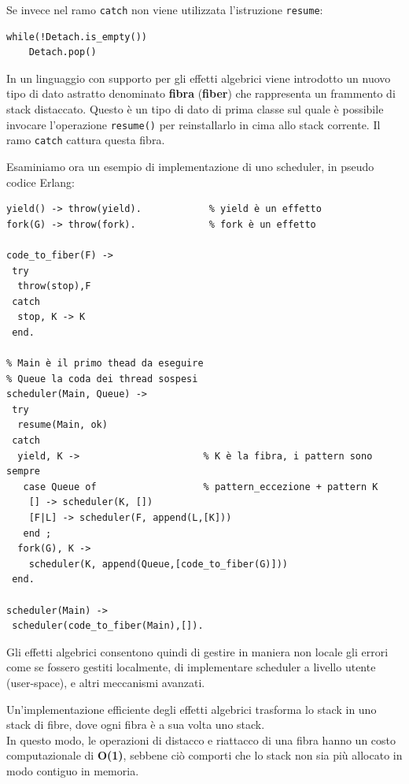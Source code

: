 \documentclass{article}
\begin{document}
Se invece nel ramo \texttt{catch} non viene utilizzata l'istruzione \texttt{resume}:
\begin{tcolorbox}
\begin{verbatim}
while(!Detach.is_empty())
    Detach.pop()
\end{verbatim}
\end{tcolorbox}
\vspace{8pt}
In un linguaggio con supporto per gli effetti algebrici viene introdotto un nuovo tipo di dato astratto denominato \textbf{fibra} (\textbf{fiber}) che rappresenta un frammento di stack distaccato. Questo è un tipo di dato di prima classe sul quale è possibile invocare l'operazione \texttt{resume()} per reinstallarlo in cima allo stack corrente. Il ramo \texttt{catch} cattura questa fibra.

Esaminiamo ora un esempio di implementazione di uno scheduler, in pseudo codice Erlang:
\begin{tcolorbox}
\begin{verbatim}
yield() -> throw(yield).            % yield è un effetto
fork(G) -> throw(fork).             % fork è un effetto

code_to_fiber(F) ->
 try
  throw(stop),F
 catch
  stop, K -> K
 end.

% Main è il primo thead da eseguire
% Queue la coda dei thread sospesi
scheduler(Main, Queue) ->
 try
  resume(Main, ok)
 catch
  yield, K ->                      % K è la fibra, i pattern sono sempre
   case Queue of                   % pattern_eccezione + pattern K
    [] -> scheduler(K, [])
    [F|L] -> scheduler(F, append(L,[K]))
   end ;
  fork(G), K ->
    scheduler(K, append(Queue,[code_to_fiber(G)]))
 end.

scheduler(Main) ->
 scheduler(code_to_fiber(Main),[]).
\end{verbatim}
\end{tcolorbox}
\vspace{8pt}
Gli effetti algebrici consentono quindi di gestire in maniera non locale gli errori come se fossero gestiti localmente, di implementare scheduler a livello utente (user-space), e altri meccanismi avanzati.

Un'implementazione efficiente degli effetti algebrici trasforma lo stack in uno stack di fibre, dove ogni fibra è a sua volta uno stack.\\
In questo modo, le operazioni di distacco e riattacco di una fibra hanno un costo computazionale di \textbf{O(1)}, sebbene ciò comporti che lo stack non sia più allocato in modo contiguo in memoria.
\end{document}

